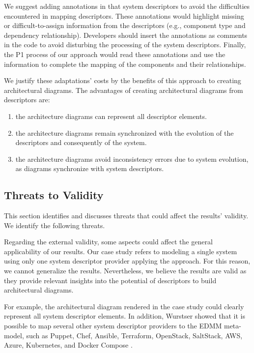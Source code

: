 \documentclass[sigconf]{acmart}
\begin{document}
We suggest adding annotations in that system descriptors to avoid the difficulties encountered in mapping descriptors. These annotations would highlight missing or difficult-to-assign information from the descriptors (e.g., component type and dependency relationship). Developers should insert the annotations as comments in the code to avoid disturbing the processing of the system descriptors. Finally, the P1 process of our approach would read these annotations and use the information to complete the mapping of the components and their relationships.

We justify these adaptations' costs by the benefits of this approach to creating architectural diagrams. The advantages of creating architectural diagrams from descriptors are: 
\begin{enumerate}
    \item the architecture diagrams can represent all descriptor elements.
    \item the architecture diagrams remain synchronized with the evolution of the descriptors and consequently of the system.
    \item the architecture diagrams avoid inconsistency errors due to system evolution, as diagrams synchronize with system descriptors.
\end{enumerate}

\subsection{Threats to Validity}

This section identifies and discusses threats that could affect the results' validity. We identify the following threats.

Regarding the external validity, some aspects could affect the general applicability of our results. Our case study refers to modeling a single system using only one system descriptor provider applying the approach. For this reason, we cannot generalize the results. Nevertheless, we believe the results are valid as they provide relevant insights into the potential of descriptors to build architectural diagrams. 

For example, the architectural diagram rendered in the case study could clearly represent all system descriptor elements. In addition, Wurstser showed that it is possible to map several other system descriptor providers to the EDMM meta-model, such as Puppet, Chef, Ansible, Terraform, OpenStack, SaltStack, AWS, Azure, Kubernetes, and Docker Compose \cite{wurster2019}.
\end{document}
